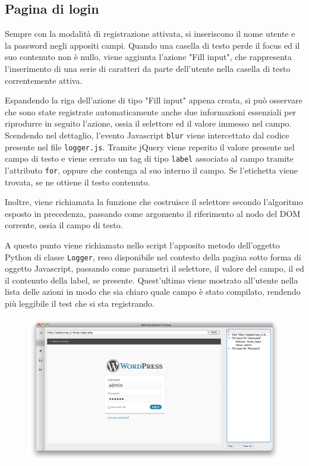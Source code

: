 \subsection{Pagina di login}

Sempre con la modalità di registrazione attivata, si inseriscono il nome utente e la password negli appositi campi. Quando una casella di testo perde il focus ed il suo contenuto non è nullo, viene aggiunta l'azione "Fill input", che rappresenta l'inserimento di una serie di caratteri da parte dell'utente nella casella di testo correntemente attiva. 

Espandendo la riga dell'azione di tipo "Fill input" appena creata, si può osservare che sono state registrate automaticamente anche due informazioni essenziali per riprodurre in seguito l'azione, ossia il selettore ed il valore immesso nel campo. Scendendo nel dettaglio, l'evento Javascript \verb|blur| viene intercettato dal codice presente nel file \verb|logger.js|. Tramite jQuery viene reperito il valore presente nel campo di testo e viene cercato un tag di tipo \verb|label| associato al campo tramite l'attributo \verb|for|, oppure che contenga al suo interno il campo. Se l'etichetta viene trovata, se ne ottiene il testo contenuto.

Inoltre, viene richiamata la funzione che costruisce il selettore secondo l'algoritmo esposto in precedenza, passando come argomento il riferimento al nodo del DOM corrente, ossia il campo di testo.

A questo punto viene richiamato nello script l'apposito metodo dell'oggetto Python di classe \verb|Logger|, reso disponibile nel contesto della pagina sotto forma di oggetto Javascript, passando come parametri il selettore, il valore del campo, il ed il contenuto della label, se presente. Quest'ultimo viene mostrato all'utente nella lista delle azioni in modo che sia chiaro quale campo è stato compilato, rendendo più leggibile il test che si sta registrando.

\begin{figure}[htbp]
\begin{center}
\includegraphics[width=\textwidth]{images/wp_tour/2_fill_login.png}
\end{center}
\end{figure}

